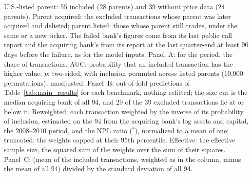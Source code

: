 \begin{table}[!t]
{U.S.-listed parent: 55 included (28 parents) and 39 without price data (24 parents). Parent acquired:
the excluded transactions whose parent was later acquired and delisted; parent listed: those whose parent still trades, under the
same or a new ticker. The failed
bank's figures come from its last public call report and the acquiring bank's from its report at the last quarter-end at least
90 days before the failure, as for the model inputs. Panel~A: for the period, the share of transactions. AUC: probability that an
included transaction has the higher value; $p$: two-sided, with inclusion permuted across listed parents (10,000
permutations), unadjusted. Panel~B: out-of-fold predictions of Table~\ref{tab:main_results} for each benchmark, nothing refitted;
the size cut is the median acquiring bank of all 94, and 29 of the 39 excluded transactions
lie at or below it. Reweighted: each transaction weighted by the inverse of its probability of inclusion, estimated on the 94 from the
acquiring bank's log assets and capital, the 2008--2010 period, and the NPL ratio ($^{*}$), normalized to a mean of one; truncated: the
weights capped at their 95th percentile. Effective: the effective sample size, the squared sum of the weights over the sum of their
squares. Panel~C: (mean of the included transactions, weighted as in the column, minus the mean of all 94) divided by the standard
deviation of all 94.}
\end{table}
